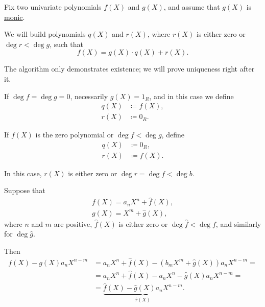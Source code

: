\begin{algorithm}\label{alg:euclidean_division_of_polynomials}
  Fix two univariate polynomials \( f(X) \) and \( g(X) \), and assume that \( g(X) \) is \hyperref[def:monic_polynomial]{monic}.

  We will build polynomials \( q(X) \) and \( r(X) \), where \( r(X) \) is either zero or \( \deg r < \deg g \), such that
  \begin{equation*}
    f(X) = g(X) \cdot q(X) + r(X).
  \end{equation*}

  The algorithm only demonstrates existence; we will prove uniqueness right after it.

  \begin{thmenum}
     If \( \deg f = \deg g = 0 \), necessarily \( g(X) = 1_R \), and in this case we define
    \begin{align*}
      q(X) &\coloneqq f(X), \\
      r(X) &\coloneqq 0_R.
    \end{align*}

     If \( f(X) \) is the zero polynomial or \( \deg f < \deg g \), define
    \begin{align*}
      q(X) &\coloneqq 0_R, \\
      r(X) &\coloneqq f(X).
    \end{align*}

    In this case, \( r(X) \) is either zero or \( \deg r = \deg f < \deg b \).

     Suppose that
    \begin{align*}
      f(X) = a_n X^n + \hat f(X), \\
      g(X) = X^m + \hat g(X),
    \end{align*}
    where \( n \) and \( m \) are positive, \( \hat f(X) \) is either zero or \( \deg \hat f < \deg f \), and similarly for \( \deg \hat g \).

    Then
    \begin{align*}
    f(X) - g(X) a_n X^{n-m}
    &=
    a_n X^n + \hat f(X) - (b_m X^m + \hat g(X)) a_n X^{n-m}
    = \\ &=
    a_n X^n + \hat f(X) - a_n X^n - \hat g(X) a_n X^{n-m}
    = \\ &=
    \underbrace{\hat f(X) - \hat g(X) a_n X^{n-m}}_{\hat r(X)}.
    \end{align*}


\end{thmenum}
\end{algorithm}
